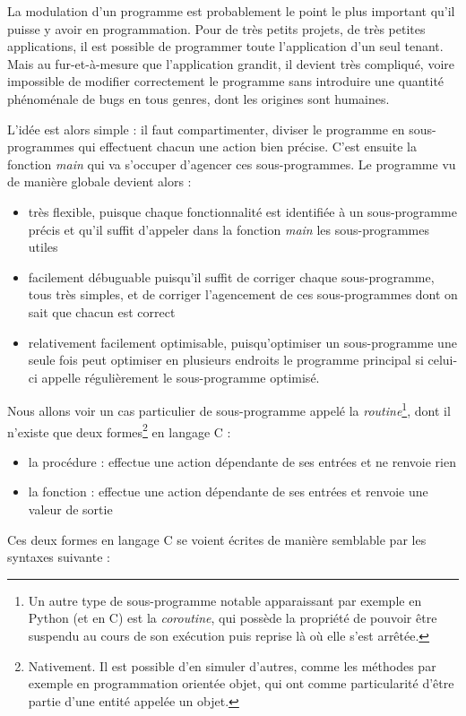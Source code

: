 \documentclass[../../../main.tex]{subfiles}
\begin{document}
La modulation d'un programme est probablement le point le plus important qu'il puisse y avoir en programmation. Pour de très petits projets, de très petites applications, il est possible de programmer toute l'application d'un seul tenant. Mais au fur-et-à-mesure que l'application grandit, il devient très compliqué, voire impossible de modifier correctement le programme sans introduire une quantité phénoménale de bugs en tous genres, dont les origines sont humaines.

L'idée est alors simple : il faut compartimenter, diviser le programme en sous-programmes qui effectuent chacun une action bien précise. C'est ensuite la fonction \textit{main} qui va s'occuper d'agencer ces sous-programmes. Le programme vu de manière globale devient alors :
\begin{itemize}
	\item très flexible, puisque chaque fonctionnalité est identifiée à un sous-programme précis et qu'il suffit d'appeler dans la fonction \textit{main} les sous-programmes utiles
	\item facilement débuguable puisqu'il suffit de corriger chaque sous-programme, tous très simples, et de corriger l'agencement de ces sous-programmes dont on sait que chacun est correct
	\item relativement facilement optimisable, puisqu'optimiser un sous-programme une seule fois peut optimiser en plusieurs endroits le programme principal si celui-ci appelle régulièrement le sous-programme optimisé.
\end{itemize}
Nous allons voir un cas particulier de sous-programme appelé la \textit{routine}\footnote{Un autre type de sous-programme notable apparaissant par exemple en Python 	(et en C) est la \textit{coroutine}, qui possède la propriété de pouvoir être suspendu au cours de son exécution puis reprise là où elle s'est arrêtée.}, dont il n'existe que deux formes\footnote{Nativement. Il est possible d'en simuler d'autres, comme les méthodes par exemple en programmation orientée objet, qui ont comme particularité d'être partie d'une entité appelée un objet.} en langage C :
\begin{itemize}
	\item la procédure : effectue une action dépendante de ses entrées et ne renvoie rien
	\item la fonction : effectue une action dépendante de ses entrées et renvoie une valeur de sortie
\end{itemize}
Ces deux formes en langage C se voient écrites de manière semblable par les syntaxes suivante :
\end{document}
